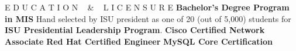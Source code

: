  

\begin{rubric}{E D U C A T I O N ~ \& ~ L I C E N S U R E}
		\entry*[1999]
			\textbf{Bachelor's Degree Program in MIS}
		\entry*Hand selected by ISU president as one of 20 (out of 5,000) students for \textbf{ISU Presidential Leadership Program}.
		\entry*[2001]\textbf{Cisco Certified Network Associate}
		\entry*[2003]\textbf{Red Hat Certified Engineer}
        \entry*[2004]\textbf{MySQL Core Certification}
\end{rubric}	

